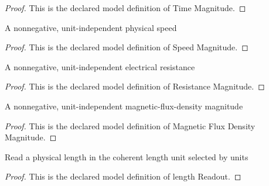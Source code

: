 \begin{proof}
  This is the declared model definition of Time Magnitude.
\end{proof}
\begin{definition}
  \label{def:physics:phyx-mini-0884:phyxminiproblems-problemphyxmini0884-speedmagnitude}
  A nonnegative, unit-independent physical speed
\end{definition}
\begin{proof}
  This is the declared model definition of Speed Magnitude.
\end{proof}
\begin{definition}
  \label{def:physics:phyx-mini-0884:phyxminiproblems-problemphyxmini0884-resistancemagnitude}
  A nonnegative, unit-independent electrical resistance
\end{definition}
\begin{proof}
  This is the declared model definition of Resistance Magnitude.
\end{proof}
\begin{definition}
  \label{def:physics:phyx-mini-0884:phyxminiproblems-problemphyxmini0884-magneticfluxdensitymagnitude}
  A nonnegative, unit-independent magnetic-flux-density magnitude
\end{definition}
\begin{proof}
  This is the declared model definition of Magnetic Flux Density Magnitude.
\end{proof}
\begin{definition}
  \label{def:physics:phyx-mini-0884:phyxminiproblems-problemphyxmini0884-lengthreadout}
  Read a physical length in the coherent length unit selected by units
\end{definition}
\begin{proof}
  This is the declared model definition of length Readout.
\end{proof}
